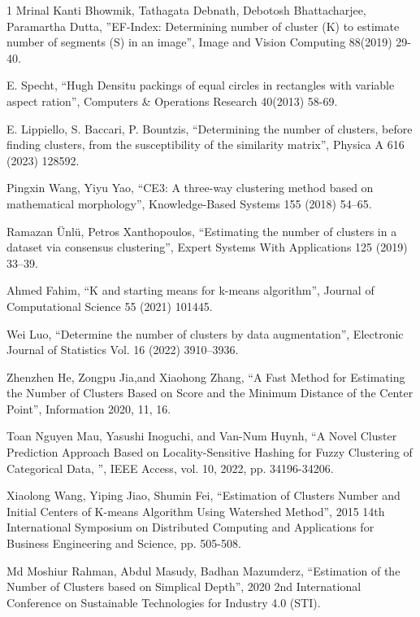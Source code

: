 \documentclass[lettersize,journal]{IEEEtran}
\begin{document}
\begin{thebibliography}{1}
Mrinal Kanti Bhowmik, Tathagata Debnath, Debotosh Bhattacharjee, Paramartha Dutta, ''EF-Index: Determining 
number of cluster (K) to estimate number of segments (S) in an image'', Image and Vision Computing 
88(2019) 29-40.

E. Specht, ``Hugh Densitu packings of equal circles in rectangles with variable aspect ration'', 
Computers \& Operations Research 40(2013) 58-69.

E. Lippiello, S. Baccari, P. Bountzis, ``Determining the number of clusters, before finding clusters,
from the susceptibility of the similarity matrix'', Physica A 616 (2023) 128592.

Pingxin Wang, Yiyu Yao, ``CE3: A three-way clustering method based on mathematical morphology'',
Knowledge-Based Systems 155 (2018) 54–65.

Ramazan Ünlü, Petros Xanthopoulos, ``Estimating the number of clusters in a dataset via consensus 
clustering'', Expert Systems With Applications 125 (2019) 33–39.

Ahmed Fahim, ``K and starting means for k-means algorithm'', Journal of Computational Science 55 (2021) 101445.

Wei Luo, ``Determine the number of clusters by data augmentation'', Electronic Journal of Statistics
Vol. 16 (2022) 3910–3936.

Zhenzhen He, Zongpu Jia,and  Xiaohong Zhang, ``A Fast Method for Estimating the Number of Clusters
Based on Score and the Minimum Distance of the Center Point'', Information 2020, 11, 16.

Toan Nguyen Mau, Yasushi Inoguchi, and Van-Num Huynh, ``A Novel Cluster Prediction Approach Based
on Locality-Sensitive Hashing for Fuzzy Clustering of Categorical Data, '', IEEE Access, vol. 10, 2022, 
pp. 34196-34206.

Xiaolong Wang, Yiping Jiao, Shumin Fei, ``Estimation of Clusters Number and Initial Centers of K-means
Algorithm Using Watershed Method'', 2015 14th International Symposium on Distributed Computing and Applications 
for Business Engineering and Science, pp. 505-508.

Md Moshiur Rahman, Abdul Masudy, Badhan Mazumderz, ``Estimation of the Number of Clusters based on
Simplical Depth'', 2020 2nd International Conference on Sustainable Technologies for
Industry 4.0 (STI).


\end{thebibliography}
\end{document}
